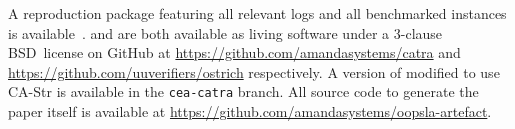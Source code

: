 A reproduction package featuring all relevant logs and all benchmarked instances is available~\cite{artefact}.
\Catra{} and \Ostrich{} are both available as living software
under a 3-clause BSD~license on GitHub at \url{https://github.com/amandasystems/catra} and \url{https://github.com/uuverifiers/ostrich}
respectively. A version of \Ostrich{} modified to use CA-Str is available in the \texttt{cea-catra} branch. All source code to generate the paper itself
is available at \url{https://github.com/amandasystems/oopsla-artefact}.